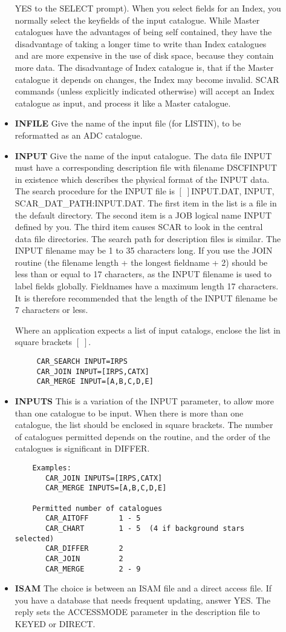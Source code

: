 \begin{description}
\begin{itemize}
YES to the SELECT prompt).
When you select fields for an Index, you normally select the keyfields of the
input catalogue.
While Master catalogues have the advantages of being self contained, they have
the disadvantage of taking a longer time to write than Index catalogues and
are more expensive in the use of disk space, because they contain more data.
The disadvantage of Index catalogue is, that if the Master catalogue it
depends on changes, the Index may become invalid.
SCAR commands (unless explicitly indicated otherwise) will accept an Index
catalogue as input, and process it like a Master catalogue.
\item{\bf INFILE} Give the name of the input file (for LISTIN), to be
reformatted as an ADC catalogue.
\item{\bf INPUT} Give the name of the input catalogue.
The data file INPUT must have a corresponding description file
with filename DSCFINPUT in existence which describes the physical
format of the INPUT data.
The search procedure for the INPUT file is $[\;]$INPUT.DAT, INPUT,
SCAR\_DAT\_PATH:INPUT.DAT.
The first item in the list is a file in the default directory.
The second item is a JOB logical name INPUT defined by you.
The third item causes SCAR to look in the central data file directories.
The search path for description files is similar.
The INPUT filename may be 1 to 35 characters long.
If you use the JOIN routine (the filename length + the longest
fieldname + 2) should be less than or equal to 17 characters, as the INPUT
filename is used to label fields globally.
Fieldnames have a maximum length 17 characters.
It is therefore recommended that the length of the INPUT filename be 7
characters or less.

Where an application expects a list of input catalogs, enclose the
list in square brackets $[\;]$.
\begin{verbatim}
     CAR_SEARCH INPUT=IRPS
     CAR_JOIN INPUT=[IRPS,CATX]
     CAR_MERGE INPUT=[A,B,C,D,E]
\end{verbatim}
\item{\bf INPUTS} This is a variation of the INPUT parameter, to allow
more than one catalogue to be input.
When there is more than one catalogue, the list should be enclosed in
square brackets.
The number of catalogues permitted depends on the routine, and the order
of the catalogues is significant in DIFFER.
\begin{verbatim}
    Examples:
       CAR_JOIN INPUTS=[IRPS,CATX]
       CAR_MERGE INPUTS=[A,B,C,D,E]

    Permitted number of catalogues
       CAR_AITOFF       1 - 5
       CAR_CHART        1 - 5  (4 if background stars selected)
       CAR_DIFFER       2
       CAR_JOIN         2
       CAR_MERGE        2 - 9
\end{verbatim}
\item{\bf ISAM} The choice is between an ISAM file and a direct access file.
If you have a database that needs frequent updating, answer YES.
The reply sets the ACCESSMODE parameter in the description file to KEYED or
DIRECT.


\end{itemize}
\end{description}
